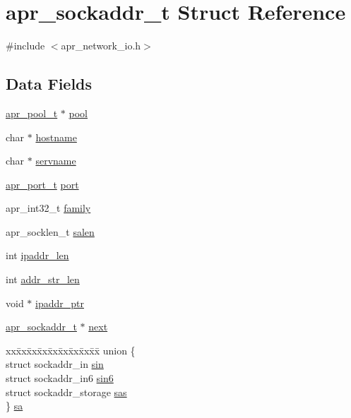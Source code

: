 \hypertarget{structapr__sockaddr__t}{\section{apr\-\_\-sockaddr\-\_\-t Struct Reference}
\label{structapr__sockaddr__t}
}


{\ttfamily \#include $<$apr\-\_\-network\-\_\-io.\-h$>$}

\subsection*{Data Fields}
\begin{DoxyCompactItemize}
\item 
\hyperlink{group__apr__pools_gaf137f28edcf9a086cd6bc36c20d7cdfb}{apr\-\_\-pool\-\_\-t} $\ast$ \hyperlink{structapr__sockaddr__t_a5f2d72a6a181cf2f54ba7c922aa0dfab}{pool}
\item 
char $\ast$ \hyperlink{structapr__sockaddr__t_a8e675775b407f25674aaa938a40de9cd}{hostname}
\item 
char $\ast$ \hyperlink{structapr__sockaddr__t_a668335161a8347b9a34c600bff80b52f}{servname}
\item 
\hyperlink{group__apr__network__io_gaa670a71960f6eb4fe0d0de2a1e7aba03}{apr\-\_\-port\-\_\-t} \hyperlink{structapr__sockaddr__t_a174c19138de9c208f13ed71b5892e505}{port}
\item 
apr\-\_\-int32\-\_\-t \hyperlink{structapr__sockaddr__t_ac17f6e803928cfc29069a6e62dcb3a52}{family}
\item 
apr\-\_\-socklen\-\_\-t \hyperlink{structapr__sockaddr__t_aef1d2a482f85eeab7b6bf0a7732a087a}{salen}
\item 
int \hyperlink{structapr__sockaddr__t_a81be21b2eb968b83ca36183213c99867}{ipaddr\-\_\-len}
\item 
int \hyperlink{structapr__sockaddr__t_a8f7cda5562e904a1398ed5a4a6f0a9d9}{addr\-\_\-str\-\_\-len}
\item 
void $\ast$ \hyperlink{structapr__sockaddr__t_a6e1b71121ada4047acde36c6777b5442}{ipaddr\-\_\-ptr}
\item 
\hyperlink{structapr__sockaddr__t}{apr\-\_\-sockaddr\-\_\-t} $\ast$ \hyperlink{structapr__sockaddr__t_a774835c6b8e3adf255b752e8b126c434}{next}
\item 
\begin{tabbing}
xx\=xx\=xx\=xx\=xx\=xx\=xx\=xx\=xx\=\kill
union \{\\
\>struct sockaddr\_in \hyperlink{structapr__sockaddr__t_a7d5cf0290260c3c448360fc819b28714}{sin}\\
\>struct sockaddr\_in6 \hyperlink{structapr__sockaddr__t_ab3a1f900d2a1e58d337a61d99e94d3f9}{sin6}\\
\>struct sockaddr\_storage \hyperlink{structapr__sockaddr__t_ac823daa30be02ee1589b4b67615cef5f}{sas}\\
\} \hyperlink{structapr__sockaddr__t_a3ca40eae640100e0f157e7c21b33a17d}{sa}\\

\end{tabbing}\end{DoxyCompactItemize}


